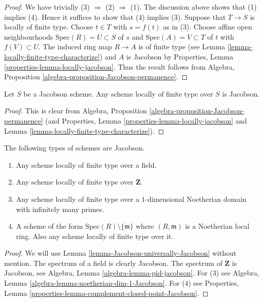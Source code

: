 \begin{proof}
We have trivially (3) $\Rightarrow$ (2) $\Rightarrow$ (1).
The discussion above shows that (1) implies (4).
Hence it suffices to show that (4) implies (3).
Suppose that $T \to S$ is locally of finite type.
Choose $t \in T$ with $s = f(t)$ as in (3).
Choose affine open neighbourhoods $\text{Spec}(R) = U \subset S$ of $s$ and
$\text{Spec}(A) = V \subset T$ of $t$ with $f(V) \subset U$.
The induced ring map $R \to A$ is of finite type
(see Lemma \ref{lemma-locally-finite-type-characterize}) and $A$ is Jacobson
by Properties, Lemma \ref{properties-lemma-locally-jacobson}.
Thus the result follows from
Algebra, Proposition \ref{algebra-proposition-Jacobson-permanence}.
\end{proof}

\begin{lemma}
\label{lemma-Jacobson-universally-Jacobson}
Let $S$ be a Jacobson scheme.
Any scheme locally of finite type over $S$ is Jacobson.
\end{lemma}

\begin{proof}
This is clear from
Algebra, Proposition \ref{algebra-proposition-Jacobson-permanence}
(and Properties, Lemma \ref{properties-lemma-locally-jacobson} and
Lemma \ref{lemma-locally-finite-type-characterize}).
\end{proof}

\begin{lemma}
\label{lemma-ubiquity-Jacobson-schemes}
The following types of schemes are Jacobson.
\begin{enumerate}
\item Any scheme locally of finite type over a field.
\item Any scheme locally of finite type over $\mathbf{Z}$.
\item Any scheme locally of finite type over a $1$-dimensional
Noetherian domain with infinitely many primes.
\item A scheme of the form $\text{Spec}(R) \setminus \{\mathfrak m\}$
where $(R, \mathfrak m)$ is a Noetherian local ring.
Also any scheme locally of finite type over it.
\end{enumerate}
\end{lemma}

\begin{proof}
We will use Lemma \ref{lemma-Jacobson-universally-Jacobson} without mention.
The spectrum of a field is clearly Jacobson.
The spectrum of $\mathbf{Z}$ is Jacobson, see
Algebra, Lemma \ref{algebra-lemma-pid-jacobson}.
For (3) see
Algebra, Lemma \ref{algebra-lemma-noetherian-dim-1-Jacobson}.
For (4) see
Properties, Lemma \ref{properties-lemma-complement-closed-point-Jacobson}.
\end{proof}







